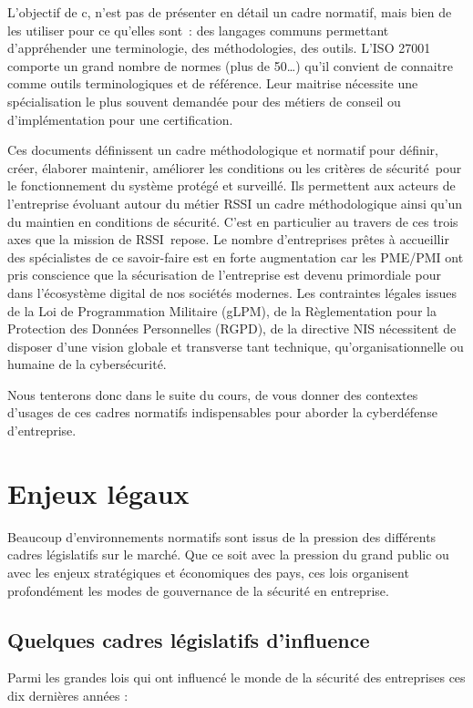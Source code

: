 \begin{nota}
L’objectif de c\edoc, n’est pas de présenter en détail un cadre normatif, mais bien de les utiliser pour ce qu’elles sont : des langages communs permettant d’appréhender une terminologie, des méthodologies, des outils. L’ISO 27001 comporte un grand nombre de normes (plus de 50…) qu’il convient de connaitre comme outils terminologiques et de référence. Leur maitrise nécessite une spécialisation le plus souvent demandée pour des métiers de conseil ou d’implémentation pour une certification.
\end{nota}

Ces documents définissent un cadre méthodologique et normatif pour définir, créer, élaborer maintenir, améliorer les conditions ou les critères de sécurité pour le fonctionnement du système protégé et surveillé. 
Ils permettent aux acteurs de l'entreprise évoluant autour du métier RSSI un cadre méthodologique ainsi qu’un  du maintien en conditions de sécurité. C’est en particulier au travers de ces trois axes que la mission de RSSI repose. 
Le nombre d’entreprises prêtes à accueillir des spécialistes de ce savoir-faire est en forte augmentation car les PME/PMI ont pris conscience que la sécurisation de l’entreprise est devenu primordiale pour  dans l’écosystème digital de nos sociétés modernes. Les contraintes légales issues de la Loi de Programmation Militaire (\gls{gLPM}), de la Règlementation pour la Protection des Données Personnelles (RGPD), de la directive NIS nécessitent de disposer d’une vision globale et transverse tant technique, qu'organisationnelle ou humaine de la cybersécurité.

Nous tenterons donc dans le suite du cours, de vous donner des contextes d'usages de ces cadres normatifs indispensables pour aborder la cyberdéfense d’entreprise. 

\section{Enjeux légaux}

Beaucoup d'environnements normatifs sont issus de la pression des différents cadres législatifs sur le marché. Que ce soit avec la pression du grand public ou avec les enjeux stratégiques et économiques des pays, ces lois organisent profondément les modes de gouvernance de la sécurité en entreprise.

\subsection{Quelques cadres législatifs d'influence}
Parmi les grandes lois qui ont influencé  le monde de la sécurité des entreprises ces dix dernières années :

